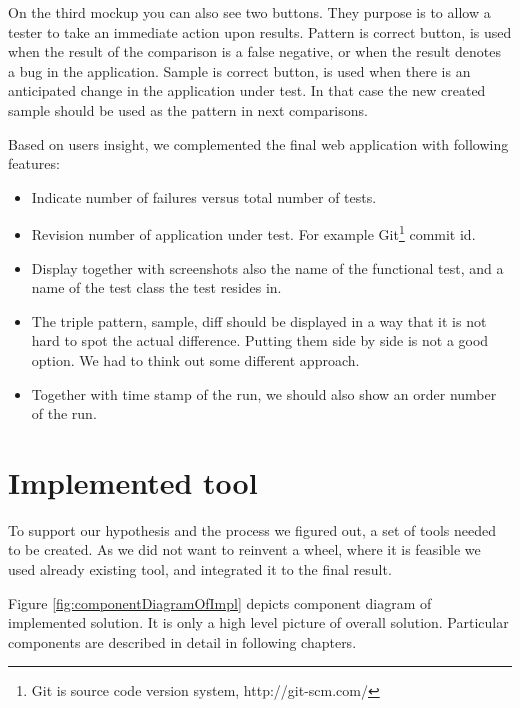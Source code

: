 \documentclass[11pt,oneside,final]{fithesis2}
\begin{document}
  On the third mockup you can also see two buttons. They purpose is to allow a tester to take an immediate
  action upon results. Pattern is correct button, is used when the result of the comparison is
  a false negative, or when the result denotes a bug in the application. Sample is correct button, is used
  when there is an anticipated change in the application under test. 
  In that case the new created sample should be used as the pattern in next comparisons.
  
  Based on users insight, we complemented the final web application with following features:
  
  \begin{itemize}
   \item Indicate number of failures versus total number of tests.
   \item Revision number of application under test. For example Git\footnote{Git is source code version system, http://git-scm.com/}
   commit id.
   \item Display together with screenshots also the name of the functional test, and a name of the test class
   the test resides in.
   \item The triple pattern, sample, diff should be displayed in a way that it is not hard to spot the
   actual difference. Putting them side by side is not a good option. We had to think out some different
   approach.
   \item Together with time stamp of the run, we should also show an order number of the run.
  \end{itemize}

  
\chapter{Implemented tool}
To support our hypothesis and the process we figured out, a set of tools needed to be created. As we did
not want to reinvent a wheel, where it is feasible we used already existing tool, and integrated it to the
final result.

Figure \ref{fig:componentDiagramOfImpl} depicts component diagram of implemented solution. It is only a high
level picture of overall solution. Particular components are described in detail in following chapters.
\end{document}
